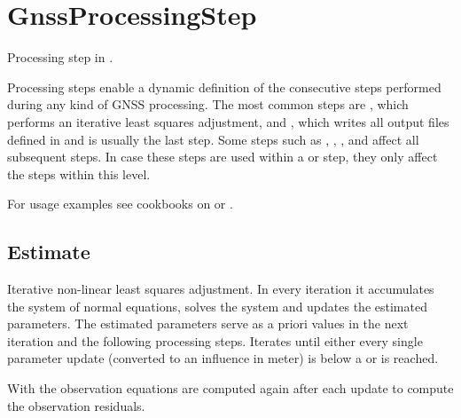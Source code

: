 \clearpage

\section{GnssProcessingStep}\label{gnssProcessingStepType}
Processing step in .

Processing steps enable a dynamic definition of the consecutive steps performed during any kind of GNSS processing.
The most common steps are , which performs an iterative least
squares adjustment, and , which writes all output files
defined in  and is usually the last step.
Some steps such as ,
,
, and
 affect all subsequent steps.
In case these steps are used within a  or
 step,
they only affect the steps within this level.

For usage examples see cookbooks on 
or .


\subsection{Estimate}\label{gnssProcessingStepType:estimate}
Iterative non-linear least squares adjustment.
In every iteration it accumulates the system of normal equations, solves the system and updates the estimated parameters.
The estimated parameters serve as a priori values in the next iteration and the following processing steps.
Iterates until either every single parameter update (converted to an influence in meter)
is below a  or  is reached.

With  the observation equations are computed
again after each update to compute the observation residuals.

